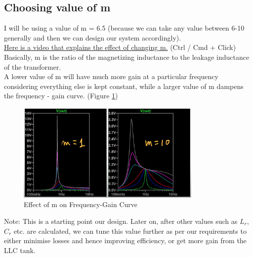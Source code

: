 \subsection{Choosing value of m}
I will be using a value of m = 6.5 (because we can take any value between 6-10 generally and then we can design our system accordingly).\\
\href{https://www.youtube.com/watch?v=qDT5xw1kgZs&t=391s}{Here is a video that explains the effect of changing m.} (Ctrl / Cmd + Click)\\
Basically, m is the ratio of the magnetizing inductance to the leakage inductance of the transformer.\\
A lower value of m will have much more gain at a particular frequency considering everything else is kept constant, while a larger value of m dampens the frequency - gain curve. (Figure \ref{fig:m_effect})\\
\begin{figure}[H]
    \centering
    \includegraphics[width=0.8\textwidth]{images/m_effect.png}
    \caption{Effect of m on Frequency-Gain Curve}
    \label{fig:m_effect}
\end{figure}
\noindent
Note: This is a starting point our design. Later on, after other values such as $L_r$, $C_r$ etc. are calculated, we can tune this value further as per our requirements to either minimise losses and hence improving efficiency, or get more gain from the LLC tank.

